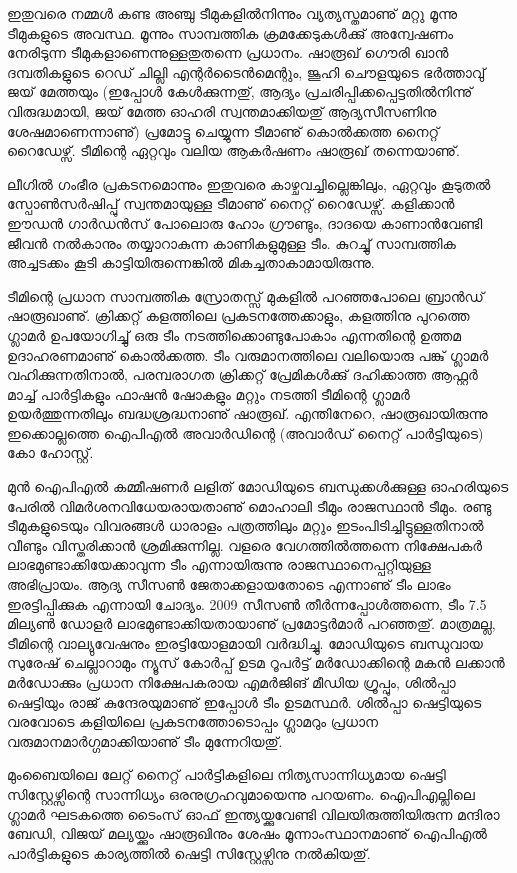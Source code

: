 ഇതുവരെ നമ്മള്‍ കണ്ട അഞ്ചു ടീമുകളില്‍നിന്നും വ്യത്യസ്തമാണു് മറ്റു മൂന്നു ടീമുകളുടെ അവസ്ഥ. മൂന്നും സാമ്പത്തിക 
ക്രമക്കേടുകള്‍ക്കു് അന്വേഷണം നേരിടുന്ന ടീമുകളാണെന്നുള്ളതുതന്നെ പ്രധാനം. ഷാരൂഖ് ഗൌരി ഖാന്‍ ദമ്പതികളുടെ റെഡ് 
ചില്ലി എന്റര്‍ടൈന്‍മെന്റും, ജൂഹി ചൌളയുടെ ഭര്‍ത്താവു് ജയ് മേത്തയും (ഇപ്പോള്‍ കേള്‍ക്കുന്നതു്, ആദ്യം പ്രചരിപ്പിക്കപ്പെട്ടതില്‍നിന്നു് 
വിരുദ്ധമായി, ജയ് മേത്ത ഓഹരി സ്വന്തമാക്കിയതു് ആദ്യസീസണിനു ശേഷമാണെന്നാണു്) പ്രമോട്ടു ചെയ്യുന്ന ടീമാണു് 
കൊല്‍ക്കത്ത നൈറ്റ് റൈഡേഴ്സ്. ടീമിന്റെ ഏറ്റവും വലിയ ആകര്‍ഷണം ഷാരൂഖ് തന്നെയാണു്.

ലീഗില്‍ ഗംഭീര പ്രകടനമൊന്നും ഇതുവരെ കാഴ്ചവച്ചില്ലെങ്കിലും, ഏറ്റവും കൂടുതല്‍ സ്പോണ്‍സര്‍ഷിപ്പു് സ്വന്തമായുള്ള ടീമാണു് 
നൈറ്റ് റൈഡേഴ്സ്. കളിക്കാന്‍ ഈഡന്‍ ഗാര്‍ഡന്‍സ് പോലൊരു ഹോം ഗ്രൗണ്ടും, ദാദയെ കാണാന്‍വേണ്ടി ജീവന്‍ 
നല്‍കാനും തയ്യാറാകുന്ന കാണികളുമുള്ള ടീം. കുറച്ചു് സാമ്പത്തിക അച്ചടക്കം കൂടി കാട്ടിയിരുന്നെങ്കില്‍ മികച്ചതാകാമായിരുന്നു.

ടീമിന്റെ പ്രധാന സാമ്പത്തിക സ്രോതസ്സ് മുകളില്‍ പറഞ്ഞപോലെ ബ്രാന്‍ഡ് ഷാരൂഖാണു്. ക്രിക്കറ്റ് കളത്തിലെ 
പ്രകടനത്തേക്കാളും, കളത്തിനു പുറത്തെ ഗ്ലാമര്‍ ഉപയോഗിച്ചു് ഒരു ടീം നടത്തിക്കൊണ്ടുപോകാം എന്നതിന്റെ ഉത്തമ 
ഉദാഹരണമാണു് കൊല്‍ക്കത്ത. ടീം വരുമാനത്തിലെ വലിയൊരു പങ്കു് ഗ്ലാമര്‍ വഹിക്കുന്നതിനാല്‍, പരമ്പരാഗത ക്രിക്കറ്റ് 
പ്രേമികള്‍ക്കു് ദഹിക്കാത്ത ആഫ്റ്റര്‍ മാച്ച് പാര്‍ട്ടികളും ഫാഷന്‍ ഷോകളും മറ്റും നടത്തി ടീമിന്റെ ഗ്ലാമര്‍ ഉയര്‍ത്തുന്നതിലും 
ബദ്ധശ്രദ്ധനാണു് ഷാരൂഖ്. എന്തിനേറെ, ഷാരൂഖായിരുന്നു ഇക്കൊല്ലത്തെ ഐപിഎല്‍ അവാര്‍ഡിന്റെ (അവാര്‍ഡ് 
നൈറ്റ് പാര്‍ട്ടിയുടെ) കോ ഹോസ്റ്റ്.

മുന്‍ ഐപിഎല്‍ കമ്മീഷണര്‍ ലളിത് മോഡിയുടെ ബന്ധുക്കള്‍ക്കുള്ള ഓഹരിയുടെ പേരില്‍ വിമര്‍ശനവിധേയരായതാണു് 
മൊഹാലി ടീമും രാജസ്ഥാന്‍ ടീമും. രണ്ടു ടീമുകളുടെയും വിവരങ്ങള്‍ ധാരാളം പത്രത്തിലും മറ്റും ഇടംപിടിച്ചിട്ടുള്ളതിനാല്‍ വീണ്ടും 
വിസ്തരിക്കാന്‍ ശ്രമിക്കുന്നില്ല. വളരെ വേഗത്തില്‍ത്തന്നെ നിക്ഷേപകര്‍ ലാഭമുണ്ടാക്കിയേക്കാവുന്ന ടീം എന്നായിരുന്നു 
രാജസ്ഥാനെപ്പറ്റിയുള്ള അഭിപ്രായം. ആദ്യ സീസണ്‍ ജേതാക്കളായതോടെ എന്നാണു് ടീം ലാഭം ഇരട്ടിപ്പിക്കുക എന്നായി ചോദ്യം.  
2009 സീസണ്‍ തീര്‍ന്നപ്പോള്‍ത്തന്നെ, 
ടീം 7.5 മില്യണ്‍ ഡോളര്‍ ലാഭമുണ്ടാക്കിയതായാണു് പ്രമോട്ടര്‍മാര്‍ പറഞ്ഞതു്. മാത്രമല്ല, ടീമിന്റെ വാല്യുവേഷനും ഇരട്ടിയോളമായി 
വര്‍ദ്ധിച്ചു. മോഡിയുടെ ബന്ധുവായ സുരേഷ് ചെല്ലാറാമും ന്യൂസ് കോര്‍പ്പ് ഉടമ റൂപര്‍ട്ട് മര്‍ഡോക്കിന്റെ മകന്‍ ലക്കാന്‍ 
മര്‍ഡോക്കും പ്രധാന നിക്ഷേപകരായ എമര്‍ജിങ് മീഡിയ ഗ്രൂപ്പും, ശില്‍പ്പാ ഷെട്ടിയും രാജ് കുന്ദേരയുമാണു് ഇപ്പോള്‍ ടീം 
ഉടമസ്ഥര്‍. ശില്‍പ്പാ ഷെട്ടിയുടെ വരവോടെ കളിയിലെ പ്രകടനത്തോടൊപ്പം ഗ്ലാമറും പ്രധാന വരുമാനമാര്‍ഗ്ഗമാക്കിയാണു് 
ടീം മുന്നേറിയതു്.

മുംബൈയിലെ ലേറ്റ് നൈറ്റ് പാര്‍ട്ടികളിലെ നിത്യസാന്നിധ്യമായ ഷെട്ടി സിസ്റ്റേഴ്സിന്റെ സാന്നിധ്യം ഒരനുഗ്രഹവുമായെന്നു 
പറയണം. ഐപിഎല്ലിലെ ഗ്ലാമര്‍ ഘടകത്തെ ടൈംസ് ഓഫ് ഇന്ത്യയ്ക്കുവേണ്ടി വിലയിരുത്തിയിരുന്ന മന്ദിരാ ബേഡി, 
വിജയ് മല്യയ്ക്കും ഷാരൂഖിനും ശേഷം മൂന്നാംസ്ഥാനമാണു് ഐപിഎല്‍ പാര്‍ട്ടികളുടെ കാര്യത്തില്‍ ഷെട്ടി സിസ്റ്റേഴ്സിനു 
നല്‍കിയതു്.

